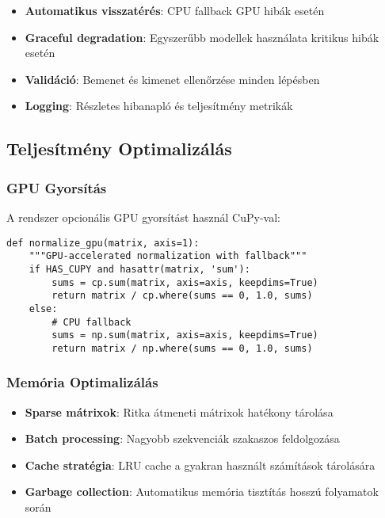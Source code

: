 \begin{itemize}
    \item \textbf{Automatikus visszatérés}: CPU fallback GPU hibák esetén
    \item \textbf{Graceful degradation}: Egyszerűbb modellek használata kritikus hibák esetén
    \item \textbf{Validáció}: Bemenet és kimenet ellenőrzése minden lépésben
    \item \textbf{Logging}: Részletes hibanapló és teljesítmény metrikák
\end{itemize}

\subsection{Teljesítmény Optimalizálás}

\subsubsection{GPU Gyorsítás}

A rendszer opcionális GPU gyorsítást használ CuPy-val:

\begin{verbatim}
def normalize_gpu(matrix, axis=1):
    """GPU-accelerated normalization with fallback"""
    if HAS_CUPY and hasattr(matrix, 'sum'):
        sums = cp.sum(matrix, axis=axis, keepdims=True)
        return matrix / cp.where(sums == 0, 1.0, sums)
    else:
        # CPU fallback
        sums = np.sum(matrix, axis=axis, keepdims=True)
        return matrix / np.where(sums == 0, 1.0, sums)
\end{verbatim}

\subsubsection{Memória Optimalizálás}

\begin{itemize}
    \item \textbf{Sparse mátrixok}: Ritka átmeneti mátrixok hatékony tárolása
    \item \textbf{Batch processing}: Nagyobb szekvenciák szakaszos feldolgozása
    \item \textbf{Cache stratégia}: LRU cache a gyakran használt számítások tárolására
    \item \textbf{Garbage collection}: Automatikus memória tisztítás hosszú folyamatok során
\end{itemize}

